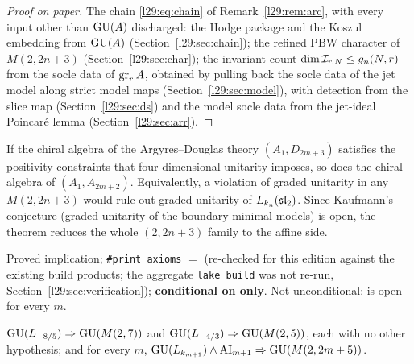 \begin{proof}[Proof on paper]
The chain \eqref{l29:eq:chain} of Remark~\ref{l29:rem:arc}, with every input other than $\mathrm{GU}(A)$ discharged:
the Hodge package and the Koszul embedding from $\mathrm{GU}(A)$ (Section~\ref{l29:sec:chain}); the refined PBW
character of $M(2,2n+3)$ (Section~\ref{l29:sec:char}); the invariant count $\dim\mathcal I_{r,N}\le g_n(N,r)$
from the socle data of $\operatorname{gr}_rA$, obtained by pulling back the socle data of the jet model along strict model
maps (Section~\ref{l29:sec:model}), with detection from the slice map (Section~\ref{l29:sec:ds}) and the model socle data
from the jet-ideal Poincar\'e lemma (Section~\ref{l29:sec:arr}).
\end{proof}

\begin{physics}
If the chiral algebra of the Argyres--Douglas theory $(A_1,D_{2m+3})$ satisfies the positivity constraints that
four-dimensional unitarity imposes, so does the chiral algebra of $(A_1,A_{2m+2})$. Equivalently, a violation of graded
unitarity in any $M(2,2n+3)$ would rule out graded unitarity of $L_{k_n}(\mathfrak{sl}_2)$. Since Kaufmann's conjecture
(graded unitarity of the boundary minimal models) is open, the theorem reduces the whole $(2,2n+3)$ family to the affine
side.
\end{physics}

\begin{status}
Proved implication; \texttt{\#print axioms} $=$  (re-checked for this edition
against the existing build products; the aggregate \texttt{lake build} was not re-run, Section~\ref{l29:sec:verification});
\textbf{conditional on  only}. Not unconditional:  is open for every $m$.
\end{status}

\begin{corollary}\label{l29:cor:m27}
$\mathrm{GU}(L_{-8/5})\Rightarrow\mathrm{GU}(M(2,7))$ and $\mathrm{GU}(L_{-4/3})\Rightarrow\mathrm{GU}(M(2,5))$,
each with no other hypothesis; and for every $m$, $\mathrm{GU}(L_{k_{m+1}})\wedge\mathrm{AI}_{m+1}\Rightarrow
\mathrm{GU}(M(2,2m+5))$.
\end{corollary}

